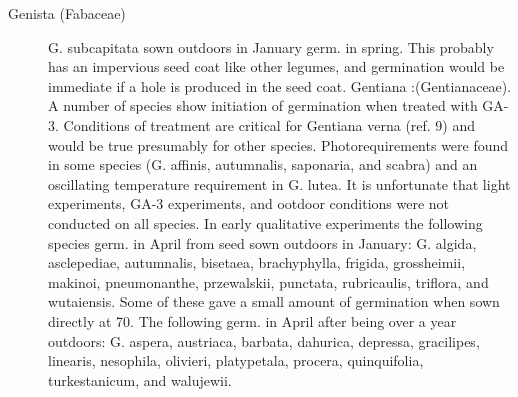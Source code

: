 \begin{description}
\item[Genista (Fabaceae)] G. subcapitata sown outdoors in January germ. in
spring. This probably has an impervious seed coat like other legumes, and
germination would be immediate if a hole is produced in the seed coat.
Gentiana :(Gentianaceae). A number of species show initiation of
germination when treated with GA-3. Conditions of treatment are critical for Gentiana
verna (ref. 9) and would be true presumably for other species. Photorequirements
were found in some species (G. affinis, autumnalis, saponaria, and scabra) and an
oscillating temperature requirement in G. lutea. It is unfortunate that light experiments,
GA-3 experiments, and ootdoor conditions were not conducted on all species. In early
qualitative experiments the following species germ. in April from seed sown outdoors
in January: G. algida, asclepediae, autumnalis, bisetaea, brachyphylla, frigida,
grossheimii, makinoi, pneumonanthe, przewalskii, punctata, rubricaulis, triflora, and
wutaiensis. Some of these gave a small amount of germination when sown directly at
70. The following germ. in April after being over a year outdoors: G. aspera, austriaca,
barbata, dahurica, depressa, gracilipes, linearis, nesophila, olivieri, platypetala,
procera, quinquifolia, turkestanicum, and walujewii.


\end{description}

